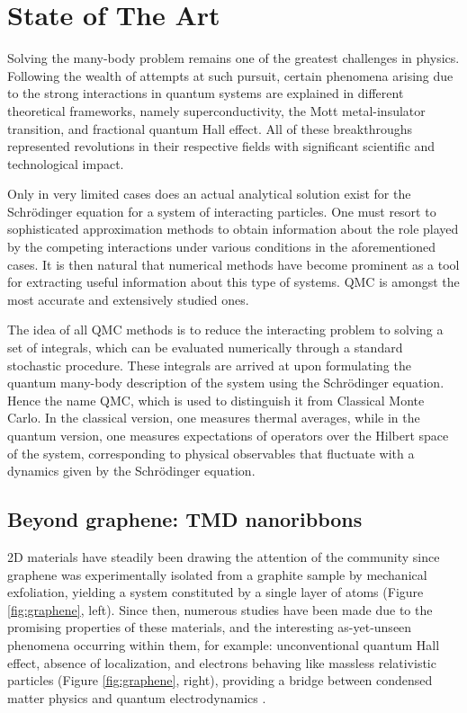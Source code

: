 \section{State of The Art}
\label{sec:int_state}

Solving the many-body problem remains one of the greatest challenges in physics.
Following the wealth of attempts at such pursuit, certain phenomena arising due to the strong interactions in quantum systems are explained in different theoretical frameworks, namely superconductivity, the Mott metal-insulator transition, and fractional quantum Hall effect.
All of these breakthroughs represented revolutions in their respective fields with significant scientific and technological impact.

Only in very limited cases does an actual analytical solution exist for the  Schr\"odinger equation for a system of interacting particles.
One must resort to sophisticated approximation methods to obtain  information about the role played by the competing interactions under various conditions in the aforementioned cases.
It is then natural that numerical methods have become prominent as a tool for extracting useful information about this type of systems.
\ac{QMC} is amongst the most accurate and extensively studied ones.

The idea of all \ac{QMC} methods is to reduce the interacting problem to solving a set of integrals, which can be evaluated numerically through a standard stochastic procedure.
These integrals are arrived at upon formulating the quantum many-body description of the system using the Schr\"odinger equation.
Hence the name \acl{QMC}, which is used to distinguish it from Classical Monte Carlo.
In the classical version, one measures thermal averages, while in the quantum version, one measures expectations of operators over the Hilbert space of the system, corresponding to physical observables that fluctuate with a dynamics given by the Schr\"odinger equation.

\subsection{Beyond graphene: TMD nanoribbons}

\ac{2D} materials have steadily been drawing the attention of the community since graphene was experimentally isolated from a graphite sample by mechanical exfoliation, yielding a system constituted by a single layer of atoms (Figure \ref{fig:graphene}, left).
Since then, numerous studies have been made due to the promising properties of these materials, and the interesting as-yet-unseen phenomena occurring within them, for example: unconventional quantum Hall effect, absence of localization, and electrons behaving like massless relativistic particles (Figure \ref{fig:graphene}, right), providing a bridge between condensed matter physics and quantum electrodynamics \cite{katsnelson_graphene:_2007}.

